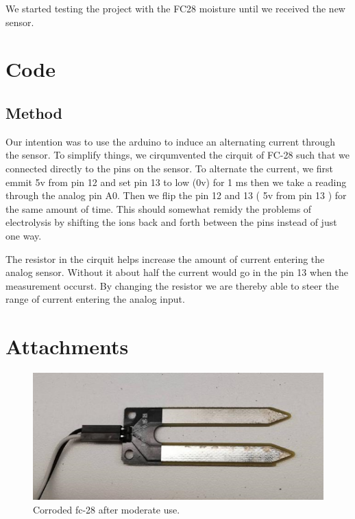 \documentclass{article}
\begin{document}
We started testing the project with the FC28 moisture until we received the new sensor.

\section{Code}

\subsection{Method}

Our intention was to use the arduino to induce an alternating current through the sensor. To simplify things, we cirqumvented the cirquit of FC-28 such that we connected directly to the pins on the sensor. To alternate the current, we first emmit 5v from pin 12 and set pin 13 to low (0v) for 1 ms then we take a reading through the analog pin A0. Then we flip the pin 12 and 13 ( 5v from pin 13 ) for the same amount of time. This should somewhat remidy the problems of electrolysis by shifting the ions back and forth between the pins instead of just one way.

The resistor in the cirquit helps increase the amount of current entering the analog sensor. Without it about half the current would go in the pin 13 when the measurement occurst. By changing the resistor we are thereby able to steer the range of current entering the analog input.


\section{Attachments}
\begin{figure}
  \centering
      \includegraphics{fc-28-corrosion}
  \caption{Corroded fc-28 after moderate use.}
\end{figure}


\pagebreak
{}

\nocite{*}
% 
\end{document}
